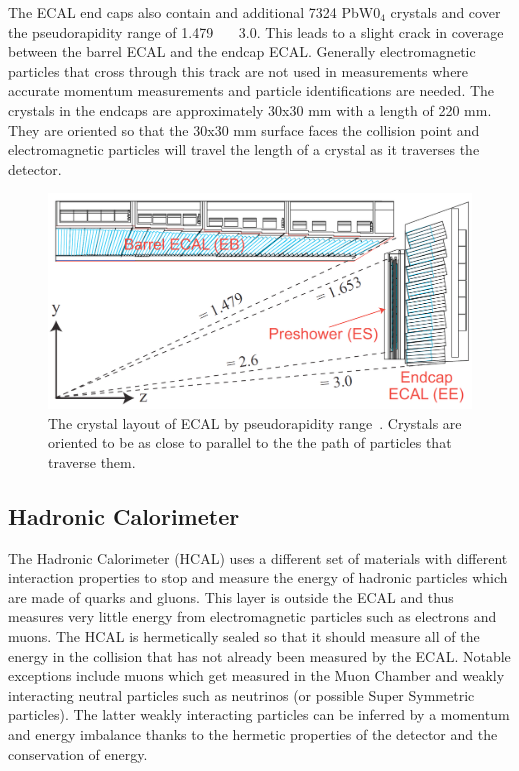	The ECAL end caps also contain and additional 7324 PbW0$_4$ crystals and cover the pseudorapidity range of 1.479 \lt \ \abseta \ \lt \ 3.0. This leads to a slight crack in coverage between the barrel ECAL and the endcap ECAL. Generally electromagnetic particles that cross through this track are not used in measurements where accurate momentum measurements and particle identifications are needed. The crystals in the endcaps are approximately 30x30 mm with a length of 220 mm. They are oriented so that the 30x30 mm surface faces the collision point and electromagnetic particles will travel the length of a crystal as it traverses the detector.
	 
	 
						\begin{figure}[h]
\begin{center}
\includegraphics[width=0.9\linewidth]{Figs/ECAL_layout.png}
\caption{\label{fig:ecal}
The crystal layout of ECAL by pseudorapidity range~\cite{tdr1}. Crystals are oriented to be as close to parallel to the the path of particles that traverse them.
}
\end{center}
\end{figure}
	
	\subsection{Hadronic Calorimeter}
	\label{sec:hadronic_calorimeter}
	The Hadronic Calorimeter (HCAL) uses a different set of materials with different interaction properties to stop and measure the energy of hadronic particles which are made of quarks and gluons. This layer is outside the ECAL and thus measures very little energy from electromagnetic particles such as electrons and muons. The HCAL is hermetically sealed so that it should measure all of the energy in the collision that has not already been measured by the ECAL. Notable exceptions include muons which get measured in the Muon Chamber and weakly interacting neutral particles such as neutrinos (or possible Super Symmetric particles). The latter weakly interacting particles can be inferred by a momentum and energy imbalance thanks to the hermetic properties of the detector and the conservation of energy.\\
	
